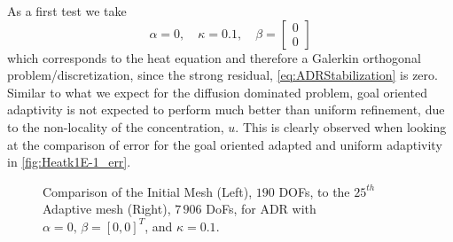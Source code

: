 \begin{test}[Pure Diffusion, i.e. Heat Equation, $\kappa = 0.1$]
    \label{tst:Heatk1E-1}
    As a first test we take
    \begin{equation*}
        \alpha = 0, \quad
        \kappa = 0.1, \quad
        \beta = \begin{bmatrix} 0 \\ 0 \end{bmatrix}
    \end{equation*}
    which corresponds to the heat equation and therefore a Galerkin orthogonal
    problem/discretization, since the strong residual,
    \eqref{eq:ADRStabilization} is zero. Similar to what we expect for the
    diffusion dominated problem, goal oriented adaptivity is not expected to
    perform much better than uniform refinement, due to the non-locality of the
    concentration, $u$. This is clearly observed when looking at the comparison
    of error for the goal oriented adapted and uniform adaptivity in
    \autoref{fig:Heatk1E-1_err}.
    \begin{figure}[h]
        \centering
        \begin{minipage}[t]{0.49\textwidth}
            \centering
        \end{minipage}
        \begin{minipage}[t]{0.49\textwidth}
            \centering
        \end{minipage}
        \caption{Comparison of the Initial Mesh (Left), $190$ DOFs, to the
                 $25^{th}$ Adaptive mesh (Right), $7\, 906$ DoFs, for ADR with
             $\alpha = 0,\, \beta = [0, 0]^T$, and $\kappa=0.1$.}
    \end{figure}


\end{test}
